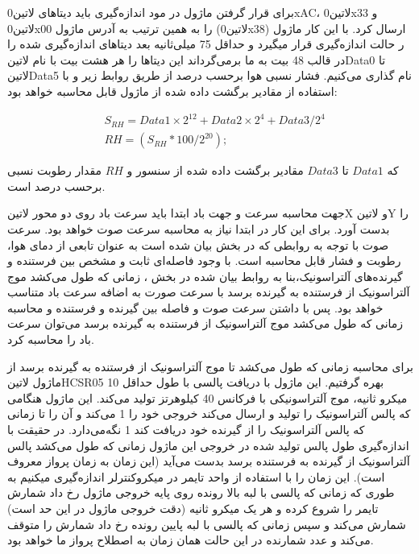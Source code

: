 برای قرار گرفتن ماژول در مود اندازه‌گیری باید دیتا‌های ‌لاتین{0xAC}، ‌لاتین{0x33} و ‌لاتین{0x00} را به همین ترتیب به آدرس ماژول (‌لاتین{0x38}) ارسال کرد. با این کار ماژول ر حالت اندازه‌گیری قرار میگیرد و حداقل 75 میلی‌ثانیه بعد دیتا‌های اندازه‌گیری شده را در قالب 48 بیت به ما برمی‌گرداند این دیتا‌ها را هر هشت بیت با نام ‌لاتین{Data0} تا ‌لاتین{Data5} نام گذاری می‌کنیم. فشار نسبی هوا برحسب درصد از طریق روابط زیر و با استفاده از مقادیر برگشت داده شده از ماژول قابل محاسبه خواهد بود:

\begin{fleqn}
	\begin{equation*}
	\begin{split}
		&S_{RH} = Data1 \times 2^{12} +  Data2 \times 2^4 + Data3 / 2^4\\
		&RH = (S_{RH} * 100 / 2^{20});
	\end{split}
	\end{equation*}
\end{fleqn}

که $Data1$ تا $Data3$ مقادیر برگشت داده شده از سنسور و $RH$ مقدار رطوبت نسبی برحسب درصد است. 

جهت محاسبه سرعت و جهت باد ابتدا باید سرعت باد روی دو محور ‌لاتین{X} و ‌لاتین{Y} را بدست آورد. برای این کار در ابتدا نیاز به محاسبه سرعت صوت خواهد بود. سرعت صوت با توجه به روابطی که در بخش  بیان شده است به عنوان تابعی از دمای هوا، رطوبت و فشار قابل محاسبه است. با وجود فاصله‌ای ثابت و مشخص بین فرستنده و گیرنده‌های آلتراسونیک،بنا به روابط بیان شده در بخش ، زمانی که طول می‌کشد موج آلتراسونیک از فرستنده به گیرنده برسد با سرعت صورت به اضافه سرعت باد متناسب خواهد بود. پس با داشتن سرعت صوت و فاصله بین گیرنده و فرستنده و محاسبه زمانی که طول می‌کشد موج آلتراسونیک از فرستنده به گیرنده برسد می‌توان سرعت باد را محاسبه کرد.

برای محاسبه زمانی که طول می‌کشد تا موج آلتراسونیک از فرستنده به گیرنده برسد از ماژول ‌لاتین{HCSR05} بهره گرفتیم. این ماژول با دریافت پالسی با طول حداقل 10 میکرو ثانیه، موج آلتراسونیکی با فرکانس 40 کیلوهرتز تولید می‌کند. این ماژول هنگامی که پالس آلتراسونیک را تولید و ارسال می‌کند خروجی خود را 1 می‌کند و آن را تا زمانی که پالس آلتراسونیک را از گیرنده خود دریافت کند 1 نگه‌می‌دارد. در حقیقت با اندازه‌گیری طول پالس تولید شده در خروجی این ماژول زمانی که طول می‌کشد پالس آلتراسونیک از گیرنده به فرستنده برسد بدست می‌آید (این زمان به زمان پرواز معروف  است). این زمان را با استفاده از واحد تایمر در میکروکنترلر اندازه‌گیری میکنیم به طوری که زمانی که پالسی با لبه بالا رونده روی پایه خروجی ماژول رخ داد شمارش تایمر را شروع کرده و هر یک میکرو ثانیه (دقت خروجی ماژول در این حد است) شمارش می‌کند و سپس زمانی که پالسی با لبه پایین رونده رخ داد شمارش را متوقف می‌کند و عدد شمارنده در این حالت همان زمان به اصطلاح پرواز ما خواهد بود.

